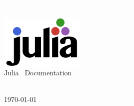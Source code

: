 
\begin{titlingpage}
    \BgThispage
    \vspace*{2cm}\noindent

    \textcolor{white}{ \MainHeading  \DocMainTitle } 
    \\[0.6cm]
    \textcolor{white}{
        \SecondaryHeading A fresh approach to technical computing.
    }
    \vspace*{3cm}\par\noindent

    \begin{center}
        \includegraphics[width=0.3\textwidth]{./assets/logo} 
        \\[1.5cm]
        { \SecondaryHeading Julia \JuliaVersion\ Documentation } 
        \vfill
        
        { \huge  \DocAuthors }
        \\[0.5cm]
        { \huge \today }
    \end{center} 
\end{titlingpage}
\restoregeometry
